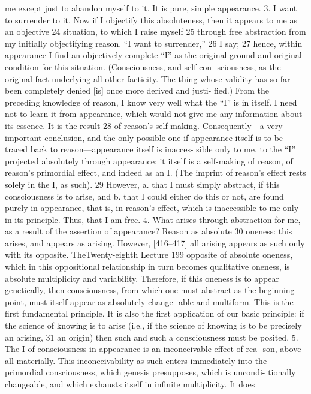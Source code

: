 me except just to abandon myself to it. It is pure, simple appearance.
3. I want to surrender to it. Now if I objectify this absoluteness, then it
appears to me as an objective 24 situation, to which I raise myself 25 through free
abstraction from my initially objectifying reason. “I want to surrender,” 26 I say; 27
hence, within appearance I find an objectively complete “I” as the original
ground and original condition for this situation. (Consciousness, and self-con-
sciousness, as the original fact underlying all other facticity. The thing whose
validity has so far been completely denied [is] once more derived and justi-
fied.) From the preceding knowledge of reason, I know very well what the “I”
is in itself. I need not to learn it from appearance, which would not give me
any information about its essence. It is the result 28 of reason’s self-making.
Consequently—a very important conclusion, and the only possible one if
appearance itself is to be traced back to reason—appearance itself is inacces-
sible only to me, to the “I” projected absolutely through appearance; it itself is
a self-making of reason, of reason’s primordial effect, and indeed as an I. (The
imprint of reason’s effect rests solely in the I, as such). 29
However, a. that I must simply abstract, if this consciousness is to arise,
and b. that I could either do this or not, are found purely in appearance, that
is, in reason’s effect, which is inaccessible to me only in its principle. Thus, that
I am free.
4. What arises through abstraction for me, as a result of the assertion of
appearance? Reason as absolute 30 oneness: this arises, and appears as arising.
However, [416–417] all arising appears as such only with its opposite. TheTwenty-eighth Lecture
199
opposite of absolute oneness, which in this oppositional relationship in turn
becomes qualitative oneness, is absolute multiplicity and variability. Therefore,
if this oneness is to appear genetically, then consciousness, from which one
must abstract as the beginning point, must itself appear as absolutely change-
able and multiform. This is the first fundamental principle. It is also the first
application of our basic principle: if the science of knowing is to arise (i.e., if
the science of knowing is to be precisely an arising, 31 an origin) then such and
such a consciousness must be posited.
5. The I of consciousness in appearance is an inconceivable effect of rea-
son, above all materially. This inconceivability as such enters immediately into
the primordial consciousness, which genesis presupposes, which is uncondi-
tionally changeable, and which exhausts itself in infinite multiplicity. It does
